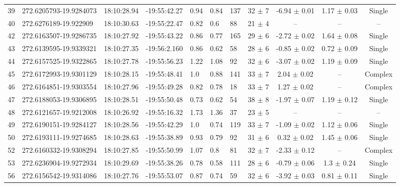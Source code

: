 \begin{table}[htbp!]
\begin{tabular}{llllllllccc}
39  &  272.6205793-19.9284073  &  18:10:28.94  &  -19:55:42.27  &  0.94  &  0.84  &  137  &  32 $\pm$ 7  &  -6.94 $\pm$ 0.01  &  1.17 $\pm$ 0.03  &  Single \\
40  &  272.6276189-19.922909  &  18:10:30.63  &  -19:55:22.47  &  0.82  &  0.6  &  88  &  21 $\pm$ 4  &  --  &  --  &  -- \\
42  &  272.6163507-19.9286735  &  18:10:27.92  &  -19:55:43.22  &  0.86  &  0.77  &  165  &  29 $\pm$ 6  &  -2.72 $\pm$ 0.02  &  1.64 $\pm$ 0.08  &  Single \\
43  &  272.6139595-19.9339321  &  18:10:27.35  &  -19:56:2.160  &  0.86  &  0.62  &  58  &  28 $\pm$ 6  &  -0.85 $\pm$ 0.02  &  0.72 $\pm$ 0.09  &  Single \\
44  &  272.6157525-19.9322865  &  18:10:27.78  &  -19:55:56.23  &  1.22  &  1.08  &  92  &  32 $\pm$ 6  &  -3.07 $\pm$ 0.02  &  1.19 $\pm$ 0.09  &  Single \\
45  &  272.6172993-19.9301129  &  18:10:28.15  &  -19:55:48.41  &  1.0  &  0.88  &  141  &  33 $\pm$ 7  &  2.04 $\pm$ 0.02  &  --  &  Complex \\
46  &  272.6164851-19.9303554  &  18:10:27.96  &  -19:55:49.28  &  0.82  &  0.78  &  18  &  33 $\pm$ 7  &  1.27 $\pm$ 0.02  &  --  &  Complex \\
47  &  272.6188053-19.9306895  &  18:10:28.51  &  -19:55:50.48  &  0.73  &  0.62  &  54  &  38 $\pm$ 8  &  -1.97 $\pm$ 0.07  &  1.19 $\pm$ 0.12  &  Single \\
48  &  272.6121657-19.9212008  &  18:10:26.92  &  -19:55:16.32  &  1.73  &  1.36  &  37  &  23 $\pm$ 5  &  --  &  --  &  -- \\
49  &  272.6190151-19.9284127  &  18:10:28.56  &  -19:55:42.29  &  1.0  &  0.74  &  119  &  33 $\pm$ 7  &  -1.09 $\pm$ 0.02  &  1.12 $\pm$ 0.06  &  Single \\
50  &  272.6193111-19.9274685  &  18:10:28.63  &  -19:55:38.89  &  0.93  &  0.79  &  92  &  31 $\pm$ 6  &  0.32 $\pm$ 0.02  &  1.45 $\pm$ 0.06  &  Single \\
52  &  272.6160332-19.9308294  &  18:10:27.85  &  -19:55:50.99  &  1.07  &  0.8  &  81  &  32 $\pm$ 7  &  -2.33 $\pm$ 0.12  &  --  &  Complex \\
53  &  272.6236904-19.9272934  &  18:10:29.69  &  -19:55:38.26  &  0.78  &  0.58  &  111  &  28 $\pm$ 6  &  -0.79 $\pm$ 0.06  &  1.3 $\pm$ 0.24  &  Single \\
56  &  272.6156542-19.9314086  &  18:10:27.76  &  -19:55:53.07  &  0.87  &  0.74  &  59  &  32 $\pm$ 6  &  -3.92 $\pm$ 0.03  &  0.81 $\pm$ 0.11  &  Single \\

\end{tabular}
\end{table}
